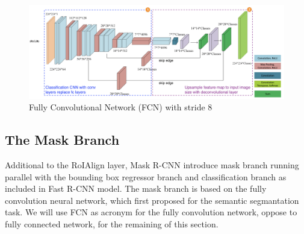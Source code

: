 \begin{figure}[!ht]
    \centering
    \includegraphics[width=5in]{figures/fcn_archite.png}
    \caption{Fully Convolutional Network (FCN) with stride 8 \cite{fcn_archite_2018}} 
    \label{fig:fcn_archite}
\end{figure}

\subsection{The Mask Branch}

Additional to the RoIAlign layer, Mask R-CNN introduce mask branch running parallel with the bounding box regressor branch and classification branch as included in Fast R-CNN model. The mask branch is based on the fully convolution neural network, which first proposed for the semantic segmantation task. We will use FCN as acronym for the fully convolution network, oppose to fully connected network, for the remaining of this section. 

